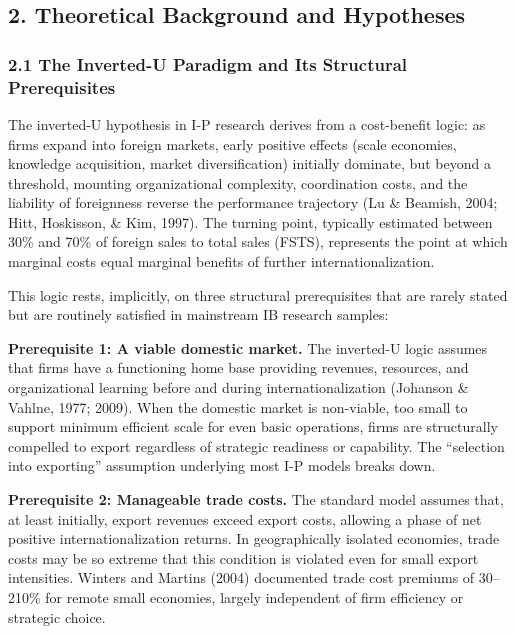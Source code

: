 \documentclass[
  12pt,a4paper]{article}
\begin{document}
\hypertarget{theoretical-background-and-hypotheses}{%
\subsection{2. Theoretical Background and
Hypotheses}\label{theoretical-background-and-hypotheses}}

\hypertarget{the-inverted-u-paradigm-and-its-structural-prerequisites}{%
\subsubsection{2.1 The Inverted-U Paradigm and Its Structural
Prerequisites}\label{the-inverted-u-paradigm-and-its-structural-prerequisites}}

The inverted-U hypothesis in I-P research derives from a cost-benefit
logic: as firms expand into foreign markets, early positive effects
(scale economies, knowledge acquisition, market diversification)
initially dominate, but beyond a threshold, mounting organizational
complexity, coordination costs, and the liability of foreignness reverse
the performance trajectory (Lu \& Beamish, 2004; Hitt, Hoskisson, \&
Kim, 1997). The turning point, typically estimated between 30\% and 70\%
of foreign sales to total sales (FSTS), represents the point at which
marginal costs equal marginal benefits of further internationalization.

This logic rests, implicitly, on three structural prerequisites that are
rarely stated but are routinely satisfied in mainstream IB research
samples:

\textbf{Prerequisite 1: A viable domestic market.} The inverted-U logic
assumes that firms have a functioning home base providing revenues,
resources, and organizational learning before and during
internationalization (Johanson \& Vahlne, 1977; 2009). When the domestic
market is non-viable, too small to support minimum efficient scale for
even basic operations, firms are structurally compelled to export
regardless of strategic readiness or capability. The ``selection into
exporting'' assumption underlying most I-P models breaks down.

\textbf{Prerequisite 2: Manageable trade costs.} The standard model
assumes that, at least initially, export revenues exceed export costs,
allowing a phase of net positive internationalization returns. In
geographically isolated economies, trade costs may be so extreme that
this condition is violated even for small export intensities. Winters
and Martins (2004) documented trade cost premiums of 30--210\% for
remote small economies, largely independent of firm efficiency or
strategic choice.
\end{document}
